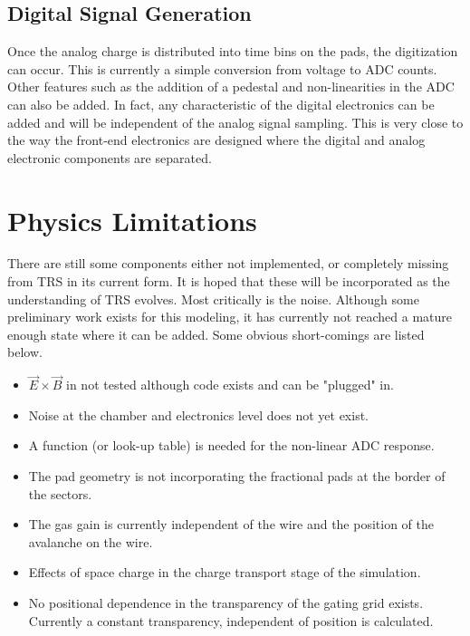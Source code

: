 \documentclass[twoside]{article}
\begin{document}
\subsection{Digital Signal Generation}

Once the analog charge is distributed into time bins on the pads,
the digitization can occur.  This is currently a simple
conversion from voltage to ADC counts.  Other features
such as the addition of a pedestal
and non-linearities in the ADC can also be added.
In fact, any characteristic of the
digital electronics can be added and will be independent
of the analog signal sampling.  This is very close to
the way the front-end electronics are designed where the
digital and analog electronic components are separated.

\section{Physics Limitations}

There are still some components either not implemented,
or completely missing from TRS in its current form.  It
is hoped that these will be incorporated as the understanding
of TRS evolves.  Most critically is the noise.  Although some
preliminary work exists for this modeling, it has currently not
reached a mature enough state where it can be added.  Some obvious
short-comings are listed below.
\begin{itemize}
  \item $\vec{E} \times \vec{B}$ in not tested although code exists
    and can be "plugged" in.
  \item Noise at the chamber and electronics level does not yet exist.
  \item A function (or look-up table) is needed for the non-linear ADC
    response.
  \item The pad geometry is not incorporating the fractional pads at the
    border of the sectors.
  \item The gas gain is currently independent of the wire and the
    position of the avalanche on the wire.
  \item Effects of space charge in the charge transport stage of the
    simulation.
  \item No positional dependence in the transparency of the gating grid
    exists.  Currently a constant transparency, independent of position
    is calculated.
\end{itemize}
\end{document}
